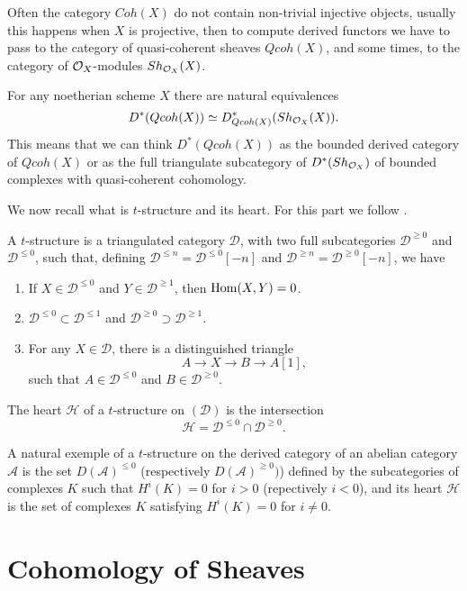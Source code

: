 \documentclass[
	oldfontcommands,
	sumario=abnt-6027-2012,
	12pt,			%
	openright,		%
	oneside,		%
	a4paper,		%
	english,		%
	brazil			%
	]{imecc-unicamp}
\begin{document}
Often the category $Coh(X)$ do not contain non-trivial injective objects, usually this happens when $X$ is projective, then to compute derived functors we have to pass to the category of quasi-coherent sheaves $Qcoh(X)$, and some times, to the category of ${\mathcal O}_X$-modules $Sh_{{\mathcal O}_X}(X)$.


\begin{proposition}
	For any noetherian scheme $X$ there are natural equivalences $$
	D^*(Qcoh(X))\simeq D^*_{Qcoh(X)}(Sh_{{\mathcal O}_X}(X)).
	$$
	This means that we can think $D^*(Qcoh(X))$ as the bounded derived category of $Qcoh(X)$ or as the full triangulate subcategory of $D^*(Sh_{{\mathcal O}_X})$ of bounded complexes with quasi-coherent cohomology.	
\end{proposition}

We now recall what is $t$-structure and its heart. For this part we follow \cite{beilinson2018faisceaux}.

\begin{definition}
	A $t$-structure is a triangulated category $\mathcal D$, with two full subcategories $\mathcal D^{\geq0}$ and $\mathcal D^{\le0}$, such that, defining $\mathcal D^{\le n}=\mathcal D^{\le0}[-n]$ and $\mathcal D^{\geq n}=\mathcal D^{\geq0}[-n]$, we have
	\begin{enumerate}
		\item If $X\in \mathcal D^{\le0}$ and $Y\in \mathcal D^{\geq1}$, then $\operatorname{Hom}(X,Y)=0$.
		\item $\mathcal D^{\le0}\subset \mathcal D^{\le 1}$ and $\mathcal D^{\geq0}\supset \mathcal D^{\geq 1}$.
		\item For any $X\in \mathcal D$, there is a distinguished triangle $$ A\rightarrow X\rightarrow B\rightarrow A[1],$$ 
		such that $A\in\mathcal D^{\le0}$ and $B\in\mathcal D^{\geq0}$.
	\end{enumerate}
	
	The heart $\mathcal H$ of a $t$-structure on $(\mathcal D)$ is the intersection $$\mathcal H=\mathcal D^{\le0}\cap\mathcal D^{\geq0}.$$
\end{definition}

A natural exemple of a $t$-structure on the derived category of an abelian category $\mathcal A$ is the set $D(\mathcal A)^{\le0}$ (respectively $D(\mathcal A)^{\geq0})$) defined by the subcategories of complexes $K$ such that $H^i(K)=0$ for $i>0$ (repectively $i<0$), and its heart $\mathcal H$ is the set of complexes $K$ satisfying $H^i(K)=0$ for $i\neq0$.

\section{Cohomology of Sheaves}
\end{document}
